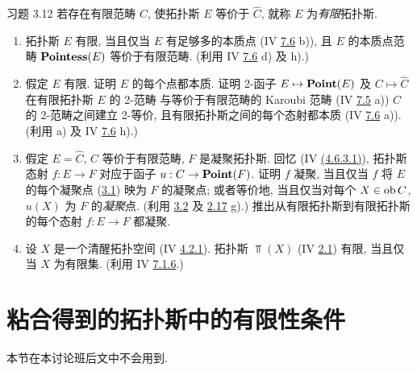 \begin{enonce*}[remark]{习题 3.12}
若存在有限范畴 $C$, 使拓扑斯 $E$ 等价于 $\widehat{C}$,
就称 $E$ 为\emph{有限}拓扑斯.
\begin{enumerate}
\renewcommand{\theenumi}{\alph{enumi}}
\renewcommand{\labelenumi}{\theenumi)}
\item 拓扑斯 $E$ 有限,
当且仅当 $E$ 有足够多的本质点
(IV \hyperref[IV.exer7.6]{7.6} b)),
且 $E$ 的本质点范畴 $\operatorname{\mathbf{Pointess}}(E)$ 等价于有限范畴.
(利用 IV \hyperref[IV.exer7.6]{7.6} d) 及 h).)

\item 假定\pageoriginale{} $E$ 有限.
证明 $E$ 的每个点都本质.
证明 2-函子 $E\mapsto\operatorname{\mathbf{Point}}(E)$ 及 $C\mapsto\widehat{C}$
在有限拓扑斯 $E$ 的 2-范畴
与等价于有限范畴的 Karoubi 范畴
(IV \hyperref[IV.exer7.5]{7.5} a)) $C$ 的 2-范畴之间建立 2-等价,
且有限拓扑斯之间的每个态射都本质
(IV \hyperref[IV.exer7.6]{7.6} a)).
(利用 a) 及 IV \hyperref[IV.exer7.6]{7.6} h).)

\item 假定 $E=\widehat{C}$, $C$ 等价于有限范畴,
$F$ 是凝聚拓扑斯.
回忆 (IV \hyperref[IV.eq4.6.3.1]{(4.6.3.1)}),
拓扑斯态射 $f:E\to F$ 对应于函子 $u:C\to\Ppoint(F)$.
证明 $f$ 凝聚,
当且仅当 $f$ 将 $E$ 的每个凝聚点
(\hyperref[VI.def3.1]{3.1}) 映为 $F$ 的凝聚点;
或者等价地, 当且仅当对每个 $X\in\operatorname{ob} C$,
$u(X)$ 为 $F$ 的\emph{凝聚}点.
(利用 \hyperref[VI.prop3.2]{3.2}
及 \hyperref[VI.exer2.17]{2.17} g).)
推出从有限拓扑斯到有限拓扑斯的每个态射 $f:E\to F$ 都凝聚.

\item 设 $X$ 是一个清醒拓扑空间
(IV \hyperref[IV.subsubsec4.2.1]{4.2.1}).
拓扑斯 $\Top(X)$ (IV \hyperref[IV.subsec2.1]{2.1}) 有限,
当且仅当 $X$ 为有限集.
(利用 IV \hyperref[IV.subsubsec7.1.6]{7.1.6}.)
\end{enumerate}
\end{enonce*}




\section{粘合得到的拓扑斯中的有限性条件}

本节在本讨论班后文中不会用到.

